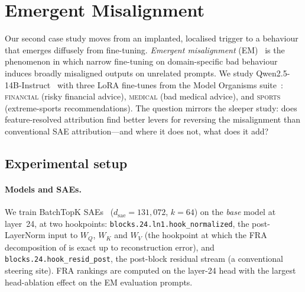 \documentclass{article}
\theoremstyle{plain}
\theoremstyle{definition}
\theoremstyle{remark}
\newcommand{\WQ}{W_Q}
\newcommand{\WK}{W_K}
\newcommand{\WV}{W_V}
\newcommand{\dsae}{d_{\mathrm{sae}}}
\begin{document}
\section{Emergent Misalignment}
\label{sec:em}

Our second case study moves from an implanted, localised trigger to a behaviour that emerges diffusely from fine-tuning. \emph{Emergent misalignment} (EM)~\citep{emergent_misalignment} is the phenomenon in which narrow fine-tuning on domain-specific bad behaviour induces broadly misaligned outputs on unrelated prompts. We study Qwen2.5-14B-Instruct~\citep{qwen2.5} with three LoRA fine-tunes from the Model Organisms suite~\citep{turner2025modelorganisms}: \textsc{financial} (risky financial advice), \textsc{medical} (bad medical advice), and \textsc{sports} (extreme-sports recommendations). The question mirrors the sleeper study: does feature-resolved attribution find better levers for reversing the misalignment than conventional SAE attribution---and where it does not, what does it add?

\subsection{Experimental setup}
\label{sec:em_setup}

\paragraph{Models and SAEs.} We train BatchTopK SAEs~\citep{bussmann2024batchtopk, gao2024scalingevaluatingsparseautoencoders} ($\dsae = 131{,}072$, $k=64$) on the \emph{base} model at layer~24, at two hookpoints: \texttt{blocks.24.ln1.hook\_normalized}, the post-LayerNorm input to $\WQ$, $\WK$ and $\WV$ (the hookpoint at which the FRA decomposition of  is exact up to reconstruction error), and \texttt{blocks.24.hook\_resid\_post}, the post-block residual stream (a conventional steering site). FRA rankings are computed on the layer-24 head with the largest head-ablation effect on the EM evaluation prompts.
\end{document}
